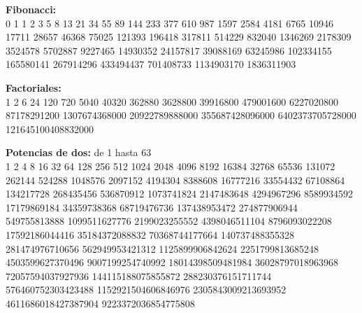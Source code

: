 \documentclass[10pt,landscape,twocolumn,letterpaper,twosided]{article}
\begin{document}
					\vspace{8mm}
					\textbf{Fibonacci:}\\
					\vspace{3mm}
					0 1 1 2 3 5 8 13 21 34 55 89 144 233 377 610 987 1597 2584 4181 6765 10946 17711 28657 46368 75025 121393 
					196418 317811 514229 832040 1346269 2178309 3524578 5702887 9227465 14930352 24157817 39088169 63245986 
					102334155 165580141 267914296 433494437 701408733 1134903170 1836311903
					
					\vspace{8mm}
					\textbf{Factoriales:}\\
					\vspace{3mm}
					1 2 6 24 120 720 5040 40320 362880 3628800 39916800 479001600 6227020800 87178291200 1307674368000 
					20922789888000 355687428096000 6402373705728000 121645100408832000
					
					\vspace{8mm}
					\textbf{Potencias de dos:} de 1 hasta 63\\
					\vspace{3mm}
					1 2 4 8 16 32 64 128 256 512 1024 2048 4096 8192 16384 32768 65536 131072 262144 524288 1048576 2097152 
					4194304 8388608 16777216 33554432 67108864 134217728 268435456 536870912 1073741824 2147483648 4294967296 
					8589934592 17179869184 34359738368 68719476736 137438953472 274877906944 549755813888 1099511627776 
					2199023255552 4398046511104 8796093022208 17592186044416 35184372088832 70368744177664 140737488355328 
					281474976710656 562949953421312 1125899906842624 2251799813685248 4503599627370496 9007199254740992 
					18014398509481984 36028797018963968 72057594037927936 144115188075855872 288230376151711744 
					576460752303423488 1152921504606846976 2305843009213693952 4611686018427387904 9223372036854775808
\end{document}
